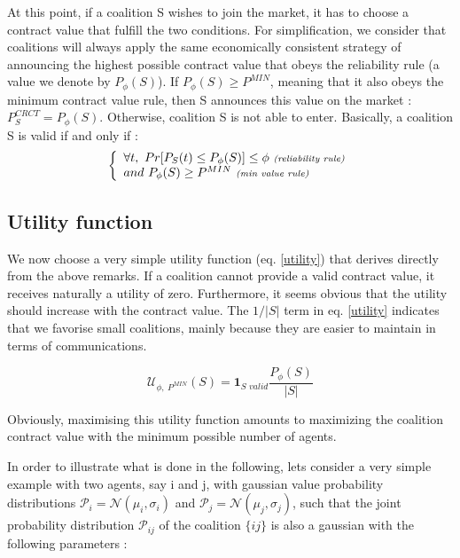 \documentclass[conference]{IEEEtran}
\begin{document}
At this point, if a coalition S wishes to join the market, it has to choose a contract value that fulfill the two conditions. For simplification, we consider that coalitions will always apply the same economically consistent strategy of announcing the highest possible contract value that obeys the reliability rule (a value we denote by $ P_{\phi}(S) $). If $ P_{\phi}(S) \geq P^{MIN} $, meaning that it also obeys the minimum contract value rule, then S announces this value on the market : $ P_{S}^{CRCT} = P_{\phi}(S) $. Otherwise, coalition S is not able to enter.
Basically, a coalition S is valid if and only if :
\begin{equation}
\left\{ \begin{array}{lll}
		\forall t,\ Pr[ P_{S}(t) \leq P_{\phi}(S)] \leq \phi\ \textit{{\scriptsize (reliability rule)}} \\
		and\ P_{\phi}(S) \geq P^{MIN}\ \textit{{\scriptsize (min value rule)}}

\end{array} \right. 
\label{rules}
\end{equation}

\subsection{Utility function}\label{subsec:UtilityFunc}
We now choose a very simple utility function (eq. \ref{utility}) that derives directly from the above remarks. If a coalition cannot provide a valid contract value, it receives naturally a utility of zero. Furthermore, it seems obvious that the utility should increase with the contract value. The $ 1/|S| $ term in eq. \ref{utility} indicates that we favorise small coalitions, mainly because they are easier to maintain in terms of communications.

\begin{equation}
 \mathcal{U}_{\phi,\ P^{MIN}}(S) = \mathbf{1}_{\textit{S\ valid}} \dfrac{P_{\phi}(S)}{|S|} 
\label{utility}
\end{equation}

Obviously, maximising this utility function amounts to maximizing the coalition contract value with the minimum possible number of agents. 

In order to illustrate what is done in the following, lets consider a very simple example with two agents, say i and j, with gaussian value probability distributions $ \mathcal{P}_{i} = \mathcal{N}(\mu_{i}, \sigma_{i}) $ and $ \mathcal{P}_{j} = \mathcal{N}(\mu_{j}, \sigma_{j}) $, such that the joint probability distribution  $ \mathcal{P}_{ij} $ of the coalition $\{ij\}$ is also a gaussian with the following parameters :
\end{document}
